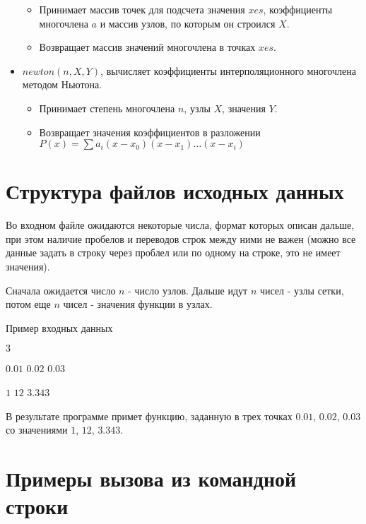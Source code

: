 \documentclass[paper=a4, fontsize=11pt]{scrartcl} %
\numberwithin{equation}{section} %
\numberwithin{figure}{section} %
\numberwithin{table}{section} %
\begin{document}
\begin{itemize}
		\begin{itemize}
		\item Принимает массив точек для подсчета значения $xes$, коэффициенты многочлена $a$ и массив узлов, по которым он строился $X$.
		\item Возвращает массив значений многочлена в точках $xes$.
		\end{itemize}
	\item $newton(n, X, Y)$, вычисляет коэффициенты интерполяционного многочлена методом Ньютона.
		\begin{itemize}
		\item Принимает степень многочлена $n$, узлы $X$, значения $Y$.
		\item Возвращает значения коэффициентов в разложении $P(x)=\sum a_i (x-x_0)(x-x_1)\dots(x-x_i)$
		\end{itemize}
\end{itemize}



\section{Структура файлов исходных данных}

Во входном файле ожидаются некоторые числа, формат которых описан дальше, при этом наличие пробелов и переводов строк между ними не важен (можно все данные задать в строку через проблел или по одному на строке, это не имеет значения).

Сначала ожидается число $n$ - число узлов.
Дальше идут $n$ чисел - узлы сетки, потом еще $n$ чисел - значения функции в узлах.

Пример входных данных

$3$

$0.01$ $0.02$ $0.03$

$1$ $12$ $3.343$


В результате программе примет функцию, заданную в трех точках $0.01$, $0.02$, $0.03$ со значениями $1$, $12$, $3.343$.

\section{Примеры вызова из командной строки}
\end{document}
